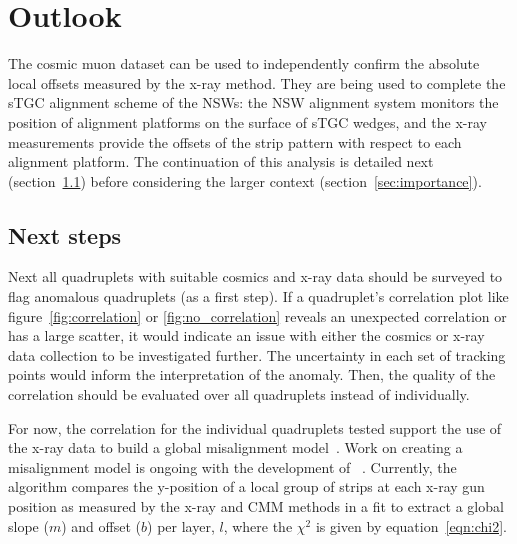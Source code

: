 
\chapter{Outlook}
\label{chap:outlook}

The cosmic muon dataset can be used to independently confirm the absolute local offsets measured by the x-ray method. They are being used to complete the sTGC alignment scheme of the NSWs: the NSW alignment system monitors the position of alignment platforms on the surface of sTGC wedges, and the x-ray measurements provide the offsets of the strip pattern with respect to each alignment platform. The continuation of this analysis is detailed next (section~\ref{sec:next}) before considering the larger context (section~\ref{sec:importance}). 

\section{Next steps}
\label{sec:next}

Next all quadruplets with suitable cosmics and x-ray data should be surveyed to flag anomalous quadruplets (as a first step). If a quadruplet's correlation plot like figure~\ref{fig:correlation} or \ref{fig:no_correlation} reveals an unexpected correlation or has a large scatter, it would indicate an issue with either the cosmics or x-ray data collection to be investigated further. The uncertainty in each set of tracking points would inform the interpretation of the anomaly. Then, the quality of the correlation should be evaluated over all quadruplets instead of individually. 
 
For now, the correlation for the individual quadruplets tested support the use of the x-ray data to build a global misalignment model~\cite{lefebvre_precision_2020}. Work on creating a misalignment model is ongoing with the development of ~\cite{lefebvre_stgc_as_built_fit}. Currently, the algorithm compares the y-position of a local group of strips at each x-ray gun position as measured by the x-ray and CMM methods in a fit to extract a global slope ($m$) and offset ($b$) per layer, $l$, where the $\chi^2$ is given by equation~\ref{eqn:chi2}.

